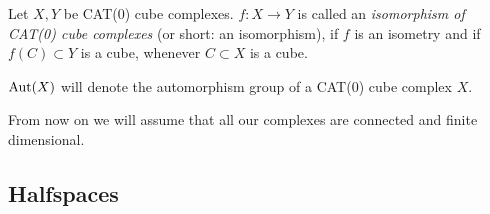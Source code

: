 \begin{defin}
  Let \(X,Y\) be CAT(0) cube complexes. \(f\colon X \to Y\) is called an \emph{isomorphism of CAT(0) cube complexes} (or short: an isomorphism), if \(f\) is an isometry and if \(f(C) \subset Y\) is a cube, whenever \(C \subset X\) is a cube.

  \(\operatorname{Aut}(X)\) will denote the automorphism group of a CAT(0) cube complex \(X\).
\end{defin}

\begin{rem}
  From now on we will assume that all our complexes are connected and finite dimensional.
\end{rem}

\subsection{Halfspaces}
\label{sec:halfspaces}



